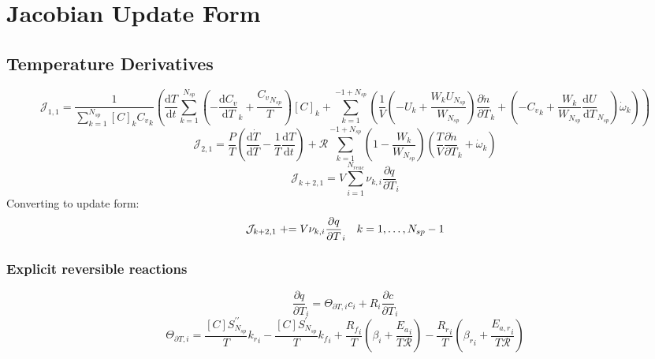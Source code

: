 \documentclass[a4paper,10pt]{article}
\newcommand{\pluseq}{\mathrel{{+}{=}}}
\newcommand{\ns}{N_{sp}}
\newcommand{\nr}{N_{reac}}
\newcommand{\Ru}{\mathcal{R}}
\begin{document}
\section{Jacobian Update Form}
\subsection{Temperature Derivatives}
\begin{dmath} \mathcal{J}_{1,1} = \frac{1}{\sum_{k=1}^{\ns} [C]_{k} {C_v}_{k}} \left(\frac{\text{d} T }{\text{d} t } \sum_{k=1}^{\ns} \left(- \frac{\text{d} {C_v} }{\text{d} T }_{k} + \frac{{C_v}_{\ns}}{T}\right) [C]_{k} + \sum_{k=1}^{-1 + \ns} \left(\frac{1}{V} \left(- U_{k} + \frac{W_{k} U_{\ns}}{W_{\ns}}\right) \frac{\partial \dot{n} }{\partial T }_{k} + \left(- {C_v}_{k} + \frac{W_{k}}{W_{\ns}} \frac{\text{d} U }{\text{d} T }_{\ns}\right) \dot{\omega}_{k}\right)\right)\end{dmath} 
\begin{dmath} \mathcal{J}_{2,1} = \frac{P}{T} \left(\frac{\text{d} \dot{T} }{\text{d} T } - \frac{1}{T} \frac{\text{d} T }{\text{d} t }\right) + \Ru \sum_{k=1}^{-1 + \ns} \left(1 - \frac{W_{k}}{W_{\ns}}\right) \left(\frac{T}{V} \frac{\partial \dot{n} }{\partial T }_{k} + \dot{\omega}_{k}\right)\end{dmath} 
\begin{dmath} \mathcal{J}_{k + 2,1} = V \sum_{i=1}^{\nr} \nu_{k,i} \frac{\partial q }{\partial T }_{i}\end{dmath} 
Converting to update form:
\begin{dmath} \mathcal{J}_{k + 2,1}\pluseq V \nu_{k,i} \frac{\partial q }{\partial T }_{i}\text{\quad} k = 1, \ldots, N_{sp} - 1\end{dmath} 
\subsubsection{Explicit reversible reactions}
\begin{dmath} \frac{\partial q }{\partial T }_{i} = \Theta_{\partial T, i} c_{i} + R_{i} \frac{\partial c }{\partial T }_{i}\end{dmath} 
\begin{dmath} \Theta_{\partial T, i} = \frac{[C] S^{\prime\prime}_{\ns}}{T} {k_r}_{i} - \frac{[C] S^{\prime}_{\ns}}{T} {k_f}_{i} + \frac{{R_f}_{i}}{T} \left(\beta_{i} + \frac{{E_{a}}_{i}}{T \Ru}\right) - \frac{{R_r}_{i}}{T} \left({\beta_r}_{i} + \frac{{E_{a,r}}_{i}}{T \Ru}\right)\end{dmath} 
\end{document}
